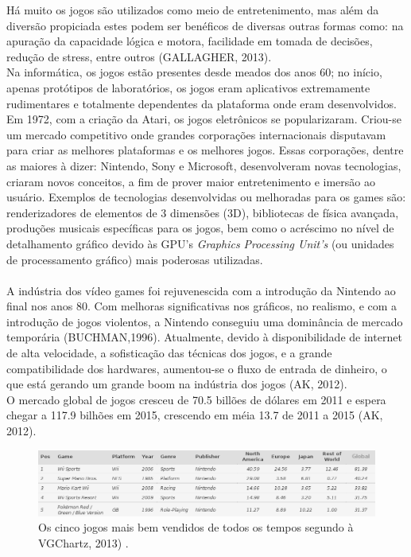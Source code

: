 \documentclass{article}
\begin{document}
Há muito os jogos são utilizados como meio de entretenimento, mas além da diversão propiciada estes podem ser benéficos de diversas outras formas como: na apuração da capacidade lógica e motora, facilidade em tomada de decisões, redução de stress, entre outros (GALLAGHER, 2013).
\\
Na informática, os jogos estão presentes desde meados dos anos 60; no início, apenas protótipos de laboratórios, os jogos eram aplicativos extremamente rudimentares e totalmente dependentes da plataforma onde eram desenvolvidos.
\\
Em 1972, com a criação da Atari, os jogos eletrônicos se popularizaram. Criou-se um mercado competitivo onde grandes corporações internacionais disputavam para criar as melhores plataformas e os melhores jogos.  Essas corporações, dentre as maiores à dizer: Nintendo, Sony e Microsoft, desenvolveram novas tecnologias, criaram novos conceitos, a fim de prover maior entretenimento e imersão ao usuário. Exemplos de tecnologias desenvolvidas ou melhoradas para os games são: renderizadores de elementos de 3 dimensões (3D), bibliotecas de física avançada, produções musicais específicas para os jogos, bem como o acréscimo no nível de detalhamento gráfico devido às GPU's \textit{Graphics Processing Unit's} (ou unidades de processamento gráfico) mais poderosas utilizadas.
\\
\\
A indústria dos vídeo games foi rejuvenescida com a introdução da Nintendo ao final nos anos 80. Com melhoras significativas  nos gráficos, no realismo, e com a introdução de jogos violentos, a Nintendo conseguiu uma dominância de mercado temporária (BUCHMAN,1996).
Atualmente, devido à disponibilidade de internet de alta velocidade, a sofisticação das técnicas dos jogos, e a grande compatibilidade dos hardwares, aumentou-se o fluxo de entrada de dinheiro, o que está gerando um grande boom na indústria dos jogos (AK, 2012).
\\
O mercado global de jogos cresceu de 70.5 billões de dólares em 2011 e espera chegar a 117.9 bilhões em 2015, crescendo em méia 13.7 de 2011 a 2015 (AK, 2012).


\begin{figure}[!htbp]
    \begin{center}
        \includegraphics[width=\textwidth]{asset/img/bestSelledGames.jpg}
        \caption{Os cinco jogos mais bem vendidos de todos os tempos segundo à VGChartz, 2013) . \label{fig:Jogos mais bem vendidos}}
    \end{center}
\end{figure}
\end{document}
